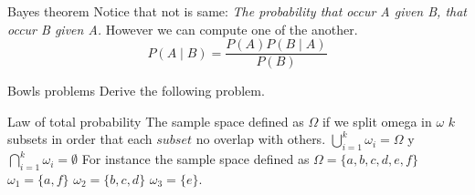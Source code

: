 \documentclass{beamer}
\begin{document}
\begin{frame}{Bayes theorem}
Notice that not is same: 
\emph{The probability that occur A given B, that occur B given A.} However we can compute one of the another.
\begin{equation}
P(A \mid B) = \frac{P(A) P(B \mid A)}{P(B)}
\end{equation}
\end{frame}



\begin{frame}{Bowls problems}
Derive the following problem.
\end{frame}




\begin{frame}{Law of total probability}
The sample space defined as $\Omega$ 
if we split omega in $\omega$ $k$ subsets in order that each $subset$ no overlap with others.
$\bigcup_{i=1}^{k} \omega_{i} = \Omega $ y $
\bigcap_{i=1}^{k} \omega_{i} = \emptyset
$
For instance the sample space defined as $ \Omega= \lbrace a ,b,c,d,e,f\rbrace$
$\omega_{1}=\lbrace a,f \rbrace$  $\omega_{2}=\lbrace b,c,d \rbrace  $ $ \omega_{3}=\lbrace e \rbrace $.
\end{frame}
\end{document}
